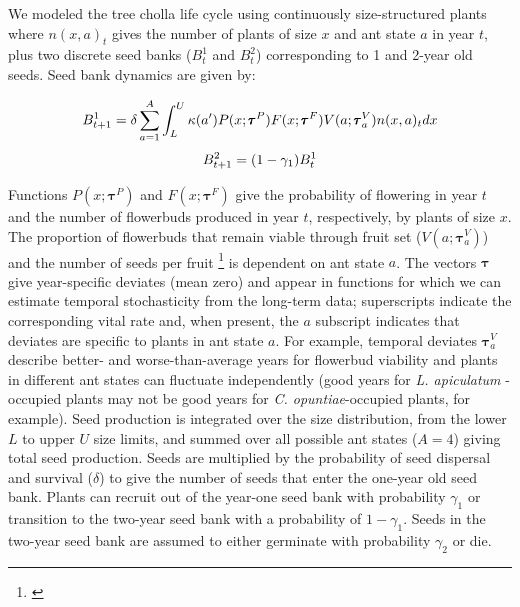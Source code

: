 \documentclass[11pt]{article}
\newcommand{\tom}[2]{{\color{red}{#1}}\footnote{\textit{\color{red}{#2}}}}
\begin{document}
We modeled the tree cholla life cycle using continuously size-structured plants where $n(x,a)_{t}$ gives the number of plants of size $x$  and ant state $a$ in year $t$, plus two discrete seed banks ($B^1_{t}$ and $B^2_{t}$) corresponding to 1 and 2-year old seeds. 
Seed bank dynamics are given by:

\begin{linenomath*}
	$$
	B^1_{t+1} = \delta \sum_{a=1}^{A} \int_L^U  \kappa(a') P(x;\pmb{\tau}^P) F(x;\pmb{\tau}^F) V(a;\pmb{\tau}^V_{a}) n(x,a)_{t} dx \\
	$$
	$$
	B^2_{t+1} =  (1 - \gamma_1)B^1_{t}\\
	$$
	\label{eqn:IPM1}
\end{linenomath*}

\noindent %
Functions $P(x;\pmb{\tau}^P)$ and $F(x;\pmb{\tau}^F)$ give the probability of flowering in year $t$ and the number of flowerbuds produced in year $t$, respectively, by plants of size $x$. 
The proportion of flowerbuds that remain viable through fruit set ($V(a;\pmb{\tau}^V_{a})$) and the number of seeds per fruit \tom{($\kappa(a)$)}{This is correct but in the equation above it is shown as $\kappa(a')$ -- I am flagging that so you can update the equation and check that the code is consistent.} is dependent on ant state $a$. 
The vectors $\pmb{\tau}$ give year-specific deviates (mean zero) and appear in functions for which we can estimate temporal stochasticity from the long-term data; superscripts indicate the corresponding vital rate and, when present, the $a$ subscript indicates that deviates are specific to plants in ant state $a$.
For example, temporal deviates $\pmb{\tau}^V_{a}$ describe better- and worse-than-average years for flowerbud viability and plants in different ant states can fluctuate independently (good years for \textit{L. apiculatum} -occupied plants may not be good years for \textit{C. opuntiae}-occupied plants, for example). 
Seed production is integrated over the size distribution, from the lower $L$ to upper $U$ size limits, and summed over all possible ant states ($A=4$) giving total seed production. 
Seeds are multiplied by the probability of seed dispersal and survival ($\delta$) to give the number of seeds that enter the one-year old seed bank. 
Plants can recruit out of the year-one seed bank with probability $\gamma_1$ or transition to the two-year seed bank with a probability of $1 - \gamma_1$. 
Seeds in the two-year seed bank are assumed to either germinate with probability $\gamma_2$ or die. 
\end{document}

